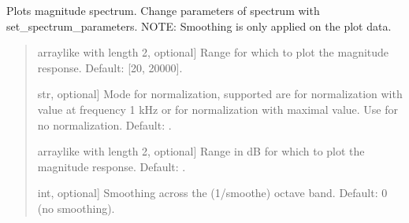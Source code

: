 \documentclass[letterpaper,10pt,english]{sphinxmanual}
\begin{document}
\begin{fulllineitems}
\begin{fulllineitems}
\label{\detokenize{classes:dsptoolbox.classes.signal_class.Signal.plot_magnitude}}
\pysigstartsignatures
{}
\pysigstopsignatures
\sphinxAtStartPar
Plots magnitude spectrum.
Change parameters of spectrum with set\_spectrum\_parameters.
NOTE: Smoothing is only applied on the plot data.
\begin{quote}\begin{description}
\begin{description}
\sphinxlineitem{\sphinxstylestrong{range\_hz}}{[}array\sphinxhyphen{}like with length 2, optional{]}
\sphinxAtStartPar
Range for which to plot the magnitude response.
Default: {[}20, 20000{]}.

\sphinxlineitem{\sphinxstylestrong{normalize}}{[}str, optional{]}
\sphinxAtStartPar
Mode for normalization, supported are  for normalization
with value at frequency 1 kHz or  for normalization with
maximal value. Use  for no normalization. Default: .

\sphinxlineitem{\sphinxstylestrong{range\_db}}{[}array\sphinxhyphen{}like with length 2, optional{]}
\sphinxAtStartPar
Range in dB for which to plot the magnitude response.
Default: .

\sphinxlineitem{\sphinxstylestrong{smoothe}}{[}int, optional{]}
\sphinxAtStartPar
Smoothing across the (1/smoothe) octave band.
Default: 0 (no smoothing).


\end{description}
\end{description}
\end{quote}
\end{fulllineitems}
\end{fulllineitems}
\end{document}
